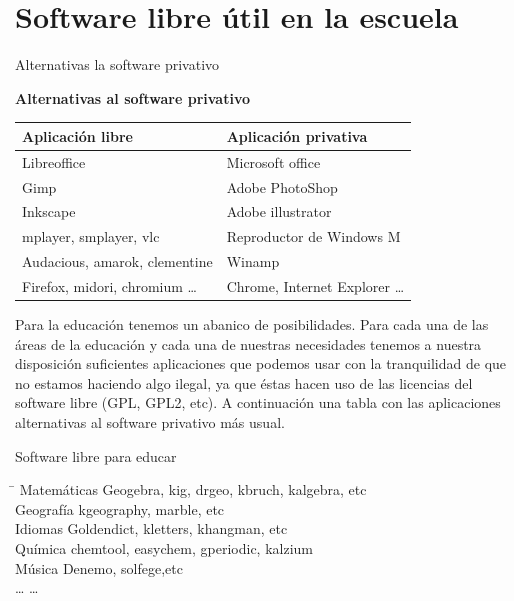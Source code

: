 \documentclass{beamer}
\begin{document}
\section{Software libre útil en la escuela}
\begin{frame}{Alternativas la software privativo}
\begin{center}
\textbf{Alternativas al software privativo}
\begin{tabular}{|l|l|}
\hline 
\textbf{Aplicación libre} & \textbf{Aplicación privativa }\\ 
\hline 
Libreoffice & Microsoft office \\ 
\hline 
Gimp & Adobe PhotoShop \\ 
\hline 
Inkscape & Adobe illustrator \\  
\hline 
mplayer, smplayer, vlc & Reproductor de Windows M \\ 
\hline 
Audacious, amarok, clementine & Winamp \\ 
\hline 
Firefox, midori, chromium \ldots & Chrome, Internet Explorer \ldots\\ 
\hline 
\end{tabular} 
\end{center}
\end{frame}
\begin{frame}
Para la educación tenemos un abanico de posibilidades. Para cada una de las áreas de la educación y cada una de nuestras necesidades tenemos a nuestra disposición suficientes aplicaciones que podemos usar con la tranquilidad de que no estamos haciendo algo ilegal, ya que éstas hacen uso de las licencias del software libre (GPL, GPL2, etc). A continuación una tabla con las aplicaciones alternativas al software privativo más usual.
\end{frame}
\begin{frame}{Software libre para educar}
\begin{tabbing}
\hspace{4cm}\=\kill
Matemáticas \> Geogebra, kig, drgeo, kbruch, kalgebra, etc \\ 
Geografía \> kgeography, marble, etc \\ 
Idiomas \> Goldendict, kletters, khangman, etc \\ 
Química \> chemtool, easychem, gperiodic, kalzium\\
Música \> Denemo, solfege,etc \\ 
\ldots \> \ldots
\end{tabbing} 
\end{frame}
\end{document}
